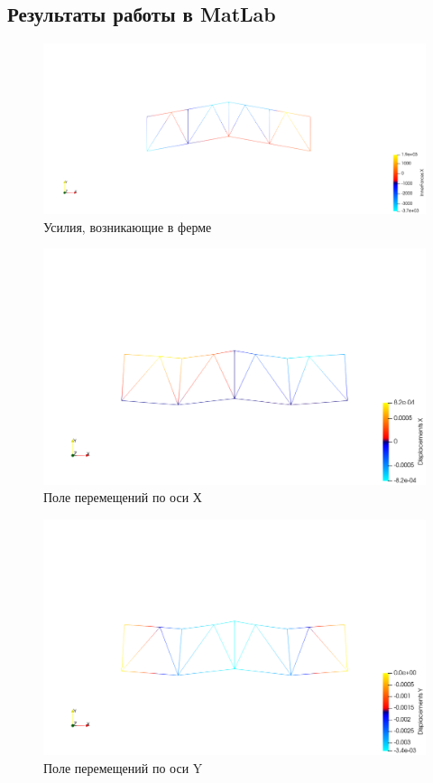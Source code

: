 \documentclass[12pt,a4paper]{article}
\begin{document}
	\subsection{Результаты работы в MatLab}
\begin{figure}[H]
	\centering
	\includegraphics[width=\textwidth]{Matlab_f}
	\caption{Усилия, возникающие в ферме}
	\label{pic1}
\end{figure}
\begin{figure}[H]
	\centering
	\includegraphics[width=\textwidth]{Matlab_ux}
	\caption{Поле перемещений по оси Х}
	\label{pic2}
\end{figure}
\begin{figure}[H]
	\centering
	\includegraphics[width=\textwidth]{Matlab_uy}
	\caption{Поле перемещений по оси Y}
	\label{pic3}
\end{figure}
\end{document}
